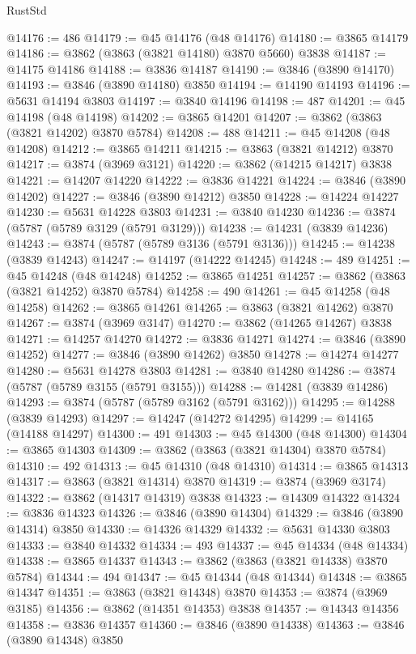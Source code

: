 \begin{lexlean}{RustStd}
\begin{coremodule}
@14176 := 486
@14179 := @45 @14176 (@48 @14176)
@14180 := @3865 @14179
@14186 := @3862 (@3863 (@3821 @14180) @3870 @5660) @3838
@14187 := @14175 @14186
@14188 := @3836 @14187
@14190 := @3846 (@3890 @14170)
@14193 := @3846 (@3890 @14180) @3850
@14194 := @14190 @14193
@14196 := @5631 @14194 @3803
@14197 := @3840 @14196
@14198 := 487
@14201 := @45 @14198 (@48 @14198)
@14202 := @3865 @14201
@14207 := @3862 (@3863 (@3821 @14202) @3870 @5784)
@14208 := 488
@14211 := @45 @14208 (@48 @14208)
@14212 := @3865 @14211
@14215 := @3863 (@3821 @14212) @3870
@14217 := @3874 (@3969 @3121)
@14220 := @3862 (@14215 @14217) @3838
@14221 := @14207 @14220
@14222 := @3836 @14221
@14224 := @3846 (@3890 @14202)
@14227 := @3846 (@3890 @14212) @3850
@14228 := @14224 @14227
@14230 := @5631 @14228 @3803
@14231 := @3840 @14230
@14236 := @3874 (@5787 (@5789 @3129 (@5791 @3129)))
@14238 := @14231 (@3839 @14236)
@14243 := @3874 (@5787 (@5789 @3136 (@5791 @3136)))
@14245 := @14238 (@3839 @14243)
@14247 := @14197 (@14222 @14245)
@14248 := 489
@14251 := @45 @14248 (@48 @14248)
@14252 := @3865 @14251
@14257 := @3862 (@3863 (@3821 @14252) @3870 @5784)
@14258 := 490
@14261 := @45 @14258 (@48 @14258)
@14262 := @3865 @14261
@14265 := @3863 (@3821 @14262) @3870
@14267 := @3874 (@3969 @3147)
@14270 := @3862 (@14265 @14267) @3838
@14271 := @14257 @14270
@14272 := @3836 @14271
@14274 := @3846 (@3890 @14252)
@14277 := @3846 (@3890 @14262) @3850
@14278 := @14274 @14277
@14280 := @5631 @14278 @3803
@14281 := @3840 @14280
@14286 := @3874 (@5787 (@5789 @3155 (@5791 @3155)))
@14288 := @14281 (@3839 @14286)
@14293 := @3874 (@5787 (@5789 @3162 (@5791 @3162)))
@14295 := @14288 (@3839 @14293)
@14297 := @14247 (@14272 @14295)
@14299 := @14165 (@14188 @14297)
@14300 := 491
@14303 := @45 @14300 (@48 @14300)
@14304 := @3865 @14303
@14309 := @3862 (@3863 (@3821 @14304) @3870 @5784)
@14310 := 492
@14313 := @45 @14310 (@48 @14310)
@14314 := @3865 @14313
@14317 := @3863 (@3821 @14314) @3870
@14319 := @3874 (@3969 @3174)
@14322 := @3862 (@14317 @14319) @3838
@14323 := @14309 @14322
@14324 := @3836 @14323
@14326 := @3846 (@3890 @14304)
@14329 := @3846 (@3890 @14314) @3850
@14330 := @14326 @14329
@14332 := @5631 @14330 @3803
@14333 := @3840 @14332
@14334 := 493
@14337 := @45 @14334 (@48 @14334)
@14338 := @3865 @14337
@14343 := @3862 (@3863 (@3821 @14338) @3870 @5784)
@14344 := 494
@14347 := @45 @14344 (@48 @14344)
@14348 := @3865 @14347
@14351 := @3863 (@3821 @14348) @3870
@14353 := @3874 (@3969 @3185)
@14356 := @3862 (@14351 @14353) @3838
@14357 := @14343 @14356
@14358 := @3836 @14357
@14360 := @3846 (@3890 @14338)
@14363 := @3846 (@3890 @14348) @3850

\end{coremodule}
\end{lexlean}
